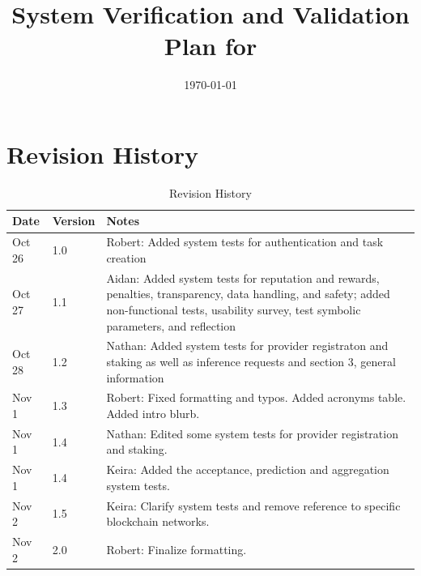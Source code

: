 \documentclass[12pt]{article}
\begin{document}
\title{System Verification and Validation Plan for \progname{}} 
\author{\authname}
\date{\today}
	
\maketitle


\section*{Revision History}

\begin{table}[htbp]
\centering
\begin{tabularx}{\textwidth}{p{3cm}p{2cm}X}
\toprule {\bf Date} & {\bf Version} & {\bf Notes}\\
\midrule
Oct 26 & 1.0 & Robert: Added system tests for authentication and task creation\\
Oct 27 & 1.1 & Aidan: Added system tests for reputation and rewards, penalties, transparency, data handling, and safety; added non-functional tests, usability survey, test symbolic parameters, and reflection\\
Oct 28 & 1.2 & Nathan: Added system tests for provider registraton and staking as well as inference requests and section 3, general information\\
Nov 1 & 1.3 & Robert: Fixed formatting and typos. Added acronyms table. Added intro blurb.\\
Nov 1 & 1.4 & Nathan: Edited some system tests for provider registration and staking.\\
Nov 1 & 1.4 & Keira: Added the acceptance, prediction and aggregation system tests.\\
Nov 2 & 1.5 & Keira: Clarify system tests and remove reference to specific blockchain networks.\\
Nov 2 & 2.0 & Robert: Finalize formatting.\\
\end{tabularx}
\caption{Revision History}
\end{table}

~\\
\end{document}
